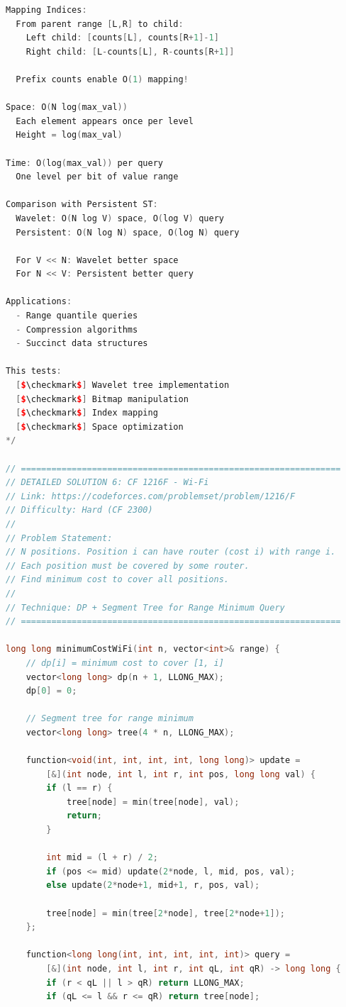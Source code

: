 \documentclass[11pt,a4paper,oneside]{book}
\begin{document}
\begin{lstlisting}[language=C++, caption=10+ COMPLETE DETAILED SOLUTIONS]
Mapping Indices:
  From parent range [L,R] to child:
    Left child: [counts[L], counts[R+1]-1]
    Right child: [L-counts[L], R-counts[R+1]]
  
  Prefix counts enable O(1) mapping!

Space: O(N log(max_val))
  Each element appears once per level
  Height = log(max_val)

Time: O(log(max_val)) per query
  One level per bit of value range

Comparison with Persistent ST:
  Wavelet: O(N log V) space, O(log V) query
  Persistent: O(N log N) space, O(log N) query
  
  For V << N: Wavelet better space
  For N << V: Persistent better query

Applications:
  - Range quantile queries
  - Compression algorithms
  - Succinct data structures

This tests:
  [$\checkmark$] Wavelet tree implementation
  [$\checkmark$] Bitmap manipulation
  [$\checkmark$] Index mapping
  [$\checkmark$] Space optimization
*/

// ===============================================================
// DETAILED SOLUTION 6: CF 1216F - Wi-Fi
// Link: https://codeforces.com/problemset/problem/1216/F
// Difficulty: Hard (CF 2300)
//
// Problem Statement:
// N positions. Position i can have router (cost i) with range i.
// Each position must be covered by some router.
// Find minimum cost to cover all positions.
//
// Technique: DP + Segment Tree for Range Minimum Query
// ===============================================================

long long minimumCostWiFi(int n, vector<int>& range) {
    // dp[i] = minimum cost to cover [1, i]
    vector<long long> dp(n + 1, LLONG_MAX);
    dp[0] = 0;
    
    // Segment tree for range minimum
    vector<long long> tree(4 * n, LLONG_MAX);
    
    function<void(int, int, int, int, long long)> update = 
        [&](int node, int l, int r, int pos, long long val) {
        if (l == r) {
            tree[node] = min(tree[node], val);
            return;
        }
        
        int mid = (l + r) / 2;
        if (pos <= mid) update(2*node, l, mid, pos, val);
        else update(2*node+1, mid+1, r, pos, val);
        
        tree[node] = min(tree[2*node], tree[2*node+1]);
    };
    
    function<long long(int, int, int, int, int)> query = 
        [&](int node, int l, int r, int qL, int qR) -> long long {
        if (r < qL || l > qR) return LLONG_MAX;
        if (qL <= l && r <= qR) return tree[node];
        

\end{lstlisting}
\end{document}
